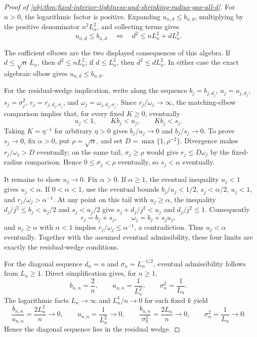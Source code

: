 \begin{proof}[Proof of \cref{obj:thm:fixed-interior-tightness-and-shrinking-radius-gap-all-d}]
For \(n>0\), the logarithmic factor is positive.  Expanding \(u_{n,d}\le b_{n,d}\), multiplying by the positive denominator \(n^2L_n^2\), and collecting terms gives
\[
u_{n,d}\le b_{n,d}
\quad\Longleftrightarrow\quad
d^2\le nL_n^2+dL_n^2 .
\]

The sufficient elbows are the two displayed consequences of this algebra.  If \(d\le\sqrt n\,L_n\), then \(d^2\le nL_n^2\); if \(d\le L_n^2\), then \(d^2\le dL_n^2\).  In either case the exact algebraic elbow gives \(u_{n,d}\le b_{n,d}\).

For the residual-wedge implication, write along the sequence \(b_j=b_{j,d_j}\), \(u_j=u_{j,d_j}\), \(s_j=\sigma_j^2\), \(r_j=r_{j,d_j,\sigma_j}\), and \(\omega_j=\omega_{j,d_j,\sigma_j}\).  Since \(r_j/\omega_j\to\infty\), the matching-elbow comparison implies that, for every fixed \(K\ge0\), eventually
\[
u_j<1,\qquad Kb_j<u_j,\qquad Kb_j<s_j.
\]
Taking \(K=\eta^{-1}\) for arbitrary \(\eta>0\) gives \(b_j/u_j\to0\) and \(b_j/s_j\to0\).  To prove \(s_j\to0\), fix \(\alpha>0\), put \(\rho=\sqrt\alpha\), and set \(D=\max\{1,\rho^{-2}\}\).  Divergence makes \(r_j/\omega_j>D\) eventually; on the same tail, \(\sigma_j\ge\rho\) would give \(r_j\le D\omega_j\) by the fixed-radius comparison.  Hence \(0\le\sigma_j<\rho\) eventually, so \(s_j<\alpha\) eventually.

It remains to show \(u_j\to0\).  Fix \(\alpha>0\).  If \(\alpha\ge1\), the eventual inequality \(u_j<1\) gives \(u_j<\alpha\).  If \(0<\alpha<1\), use the eventual bounds \(b_j/u_j<1/2\), \(s_j<\alpha/2\), \(u_j<1\), and \(r_j/\omega_j>\alpha^{-1}\).  At any point on this tail with \(u_j\ge\alpha\), the inequality \(d_j/j^2\le b_j<u_j/2\) and \(s_j<u_j/2\) give \(s_j+d_j/j^2<u_j\) and \(d_j/j^2\le1\).  Consequently
\[
r_j=b_j+s_j,\qquad \omega_j=b_j+s_ju_j,
\]
and \(u_j\ge\alpha\) with \(\alpha<1\) implies \(r_j/\omega_j\le\alpha^{-1}\), a contradiction.  Thus \(u_j<\alpha\) eventually.  Together with the assumed eventual admissibility, these four limits are exactly the residual-wedge conditions.

For the diagonal sequence \(d_n=n\) and \(\sigma_n=L_n^{-1/2}\), eventual admissibility follows from \(L_n\ge1\).  Direct simplification gives, for \(n\ge1\),
\[
b_{n,n}=\frac2n,\qquad
u_{n,n}=\frac1{L_n^2},\qquad
\sigma_n^2=\frac1{L_n}.
\]
The logarithmic facts \(L_n\to\infty\) and \(L_n^k/n\to0\) for each fixed \(k\) yield
\[
\frac{b_{n,n}}{u_{n,n}}=\frac{2L_n^2}{n}\to0,\qquad
u_{n,n}=\frac1{L_n^2}\to0,\qquad
\frac{b_{n,n}}{\sigma_n^2}=\frac{2L_n}{n}\to0,\qquad
\sigma_n^2=\frac1{L_n}\to0.
\]
Hence the diagonal sequence lies in the residual wedge.


\end{proof}
